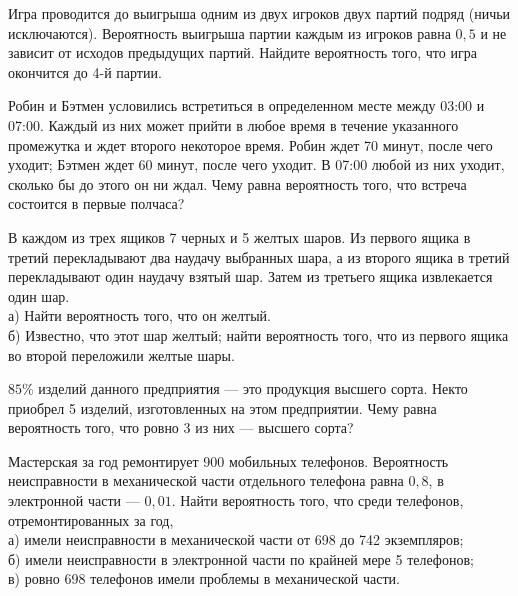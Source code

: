 \newpage\setcounter{zad}{0}



\begin{zkrW}{20}\noindent 
	Игра проводится до выигрыша одним из двух игроков двух партий подряд (ничьи исключаются). Вероятность выигрыша партии каждым из игроков равна $0{,}5$ и не зависит от исходов предыдущих партий. Найдите вероятность того, что игра окончится до 4-й партии.
 
\end{zkrW}

\begin{zkrW}{20}\noindent 
	Робин и Бэтмен условились встретиться в определенном месте между 03:00 и 07:00. Каждый из них может прийти в любое время в течение указанного промежутка и ждет второго некоторое время. Робин ждет 70 минут, после чего уходит; Бэтмен ждет 60 минут, после чего уходит. В 07:00 любой из них уходит, сколько бы до этого он ни ждал. Чему равна вероятность того, что встреча состоится в первые полчаса?
 
\end{zkrW}

\begin{zkrW}{20}\noindent 
	В каждом из трех ящиков 7 черных и 5 желтых шаров. Из первого ящика в третий перекладывают два наудачу выбранных шара, а из второго ящика в третий перекладывают один наудачу взятый шар. Затем из третьего ящика извлекается один шар. \\ \indent а) Найти вероятность того, что он желтый. \\ \indent б) Известно, что этот шар желтый; найти вероятность того, что из первого ящика во второй переложили желтые шары.
 
\end{zkrW}

\begin{zkrW}{20}\noindent 
	$85\%$ изделий данного предприятия — это продукция высшего сорта. Некто приобрел 5 изделий, изготовленных на этом предприятии. Чему равна вероятность того, что ровно 3 из них — высшего сорта?
 
\end{zkrW}

\begin{zkrW}{20}\noindent 
	Мастерская за год ремонтирует 900 мобильных телефонов. Вероятность неисправности в механической части отдельного телефона равна $0{,}8$, в электронной части --- $0{,}01$. Найти вероятность того, что среди телефонов, отремонтированных за год, \\ \indent а) имели неисправности в механической части от 698 до 742 экземпляров; \\ \indent б) имели неисправности в электронной части по крайней мере 5 телефонов; \\ \indent в) ровно 698 телефонов имели проблемы в механической части.
 
\end{zkrW}

